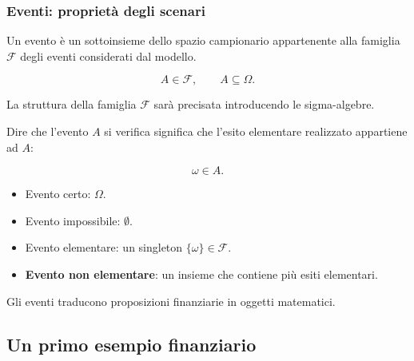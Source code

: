 \documentclass[handout]{beamer}%
\newenvironment{stepitemize}{\begin{itemize}[<+->]}{\end{itemize} }
\providecommand{\F}{\mathcal{F}}
\providecommand{\1}{\mathbf{1}}
\providecommand{\QTR}[2]{\csname #1\endcsname{#2}}
\begin{document}
\begin{frame}%
%

\frametitle{Eventi: propriet\`{a} degli scenari}%


Un evento \`{e} un sottoinsieme dello spazio campionario appartenente alla
famiglia $\F$ degli eventi considerati dal modello.%

\[
A\in\F, \qquad A\subseteq\Omega.
\]


La struttura della famiglia $\F$ sar\`{a} precisata introducendo le sigma-algebre.

Dire che l'evento $A$ si verifica significa che l'esito elementare realizzato
appartiene ad $A$:%

\[
\omega\in A.
\]


\medskip

\begin{stepitemize}
\item Evento certo: $\Omega$.

\item Evento impossibile: $\emptyset$.

\item Evento elementare: un singleton $\{\omega\}\in\F$.

\item \textbf{Evento non elementare}: un insieme che contiene pi\`{u} esiti elementari.
\end{stepitemize}

\medskip

\begin{center}
{\small Gli eventi traducono proposizioni finanziarie in oggetti matematici.}
\end{center}%

\transboxout
\end{frame}%




\subsection{Un primo esempio finanziario}%
\end{document}
